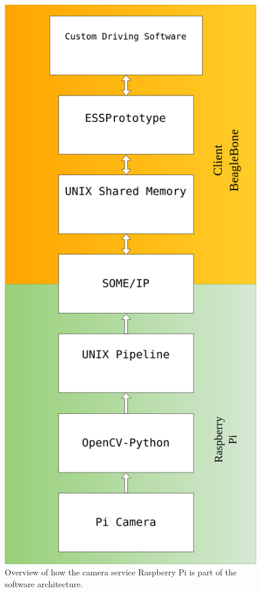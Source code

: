 \documentclass[11pt, titlepage]{article} %
\begin{document}
\begin{figure}[H]
	\centering
   	\includegraphics[scale=0.25]{arch_rpi.png}
   	\caption{Overview of how the camera service Raspberry Pi is part of the software architecture.}
    \label{fig:rpi_arch}
\end{figure}
\end{document}
